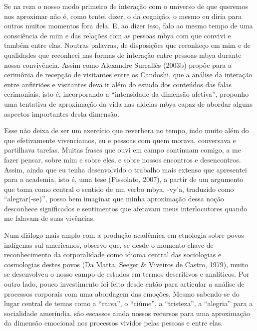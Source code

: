 \documentclass{article}
\begin{document}
Se na reza o nosso modo primeiro de intera\c{c}\~ao com o universo de
que queremos nos aproximar n\~ao \'e, como tentei dizer, o da
cogni\c{c}\~ao, o mesmo eu diria para outros muitos momentos fora dela.
E, ao dizer isso, falo ao mesmo tempo de uma consci\^encia de mim e das
rela\c{c}\~oes com as pessoas mbya com que convivi e tamb\'em entre
elas. Noutras palavras, de disposi\c{c}\~oes que reconhe\c{c}o em mim e
de qualidades que reconheci nas formas de intera\c{c}\~ao entre pessoas
mbya durante nossa conviv\^encia. Assim como Alexandre Surrall\'es
(2003b) prop\~oe para a cerim\^onia de recep\c{c}\~ao de visitantes
entre os Candoshi, que a an\'alise da intera\c{c}\~ao entre
anfitri\~oes e visitantes deva ir al\'em do estudo dos conte\'udos das
falas cerimoniais, isto \'e, incorporando a
{\textquotedblleft}intensidade da dimens\~ao
afetiva{\textquotedblright}, proponho uma tentativa de
aproxima\c{c}\~ao da vida nas aldeias mbya capaz de abordar alguns
aspectos importantes desta dimens\~ao.

Esse n\~ao deixa de ser um exerc\'icio que reverbera no tempo, indo
muito al\'em do que efetivamente vivenciamos, eu e pessoas com quem
morava, conversava e partilhava tarefas. Muitas frases que ouvi em
campo continuam comigo, a me fazer pensar, sobre mim e sobre eles, e
sobre nossos encontros e desencontros. Assim, ainda que eu tenha
desenvolvido o trabalho mais extenso que apresentei para a academia,
isto \'e, uma tese (Pissolato, 2007), a partir de um argumento que toma
como central o sentido de um verbo mbya, -vy{\textquoteright}a,
traduzido como {\textquotedblleft}alegrar(-se){\textquotedblright},
posso bem imaginar que minha aproxima\c{c}\~ao dessa no\c{c}\~ao
desconhece significados e sentimentos que afetavam meus interlocutores
quando me falavam de suas viv\^encias.

Num di\'alogo mais amplo com a produ\c{c}\~ao acad\^emica em etnologia
sobre povos ind\'igenas sul-americanos, observo que, se desde o momento
chave de reconhecimento  da corporalidade como idioma central das
sociologias e cosmologias destes povos (Da Matta, Seeger \& Viveiros de
Castro, 1979), muito se desenvolveu o nosso campo de estudos em termos
descritivos e anal\'iticos. Por outro lado, pouco investimento foi
feito desde ent\~ao para articular a an\'alise de processos corporais
com uma abordagem das emo\c{c}\~oes. Mesmo sabendo-se do lugar central
de temas como a {\textquotedblleft}raiva{\textquotedblright}, o
{\textquotedblleft}ci\'ume{\textquotedblright}, a
{\textquotedblleft}tristeza{\textquotedblright}, a
{\textquotedblleft}alegria{\textquotedblright} para a socialidade
amer\'india, s\~ao escassos ainda nossos recursos para uma
aproxima\c{c}\~ao da dimens\~ao emocional nos processos vividos pelas
pessoas e entre elas.
\end{document}
